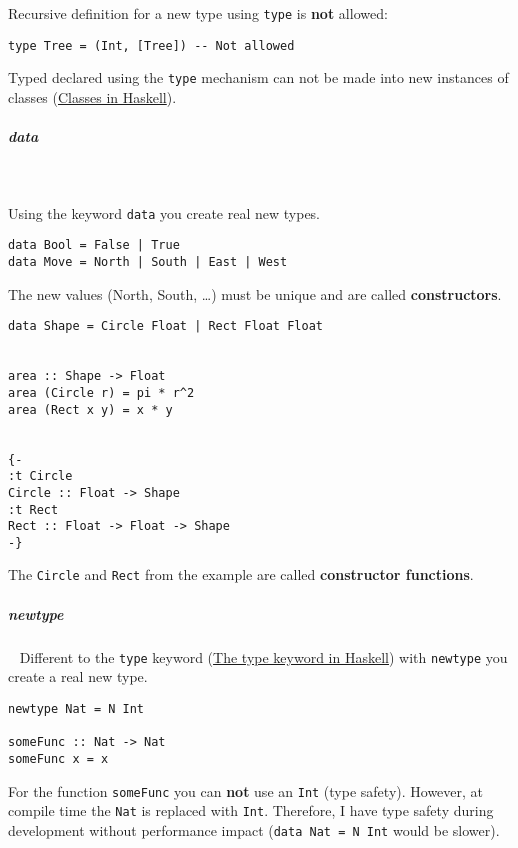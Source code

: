 \documentclass[11pt,twoside,landscape]{article}
\begin{document}
\begin{multicols}{3}
Recursive definition for a new type using \texttt{type} is \textbf{not} allowed:
\lstset{language=haskell,label= ,caption= ,captionpos=b,numbers=none}
\begin{lstlisting}
type Tree = (Int, [Tree]) -- Not allowed
\end{lstlisting}

Typed declared using the \texttt{type} mechanism can not be made into new instances of classes (\href{../../../roam/20220217095852-classes_in_haskell.org}{Classes in Haskell}).


\subparagraph{data} \
\label{sec:orga9de618}

Using the keyword \texttt{data} you create real new types.

\lstset{language=haskell,label= ,caption= ,captionpos=b,numbers=none}
\begin{lstlisting}
data Bool = False | True
data Move = North | South | East | West
\end{lstlisting}


The new values (North, South, \ldots{}) must be unique and are called \textbf{constructors}.

\lstset{language=haskell,label= ,caption= ,captionpos=b,numbers=none}
\begin{lstlisting}
data Shape = Circle Float | Rect Float Float


area :: Shape -> Float
area (Circle r) = pi * r^2
area (Rect x y) = x * y


{-
:t Circle
Circle :: Float -> Shape
:t Rect
Rect :: Float -> Float -> Shape
-}
\end{lstlisting}

The \texttt{Circle} and \texttt{Rect} from the example are called \textbf{constructor functions}.

\subparagraph{newtype} \
\label{sec:org24387c4}
Different to the \texttt{type} keyword (\href{../../../roam/20220321113101-the_type_keyword_in_haskell.org}{The type keyword in Haskell}) with \texttt{newtype} you create a real new type.

\lstset{language=haskell,label= ,caption= ,captionpos=b,numbers=none}
\begin{lstlisting}
newtype Nat = N Int

someFunc :: Nat -> Nat
someFunc x = x
\end{lstlisting}

For the function \texttt{someFunc} you can \textbf{not} use an \texttt{Int} (type safety).
However, at compile time the \texttt{Nat} is replaced with \texttt{Int}.
Therefore, I have type safety during development without performance impact (\texttt{data Nat = N Int} would be slower).


\end{multicols}
\end{document}
